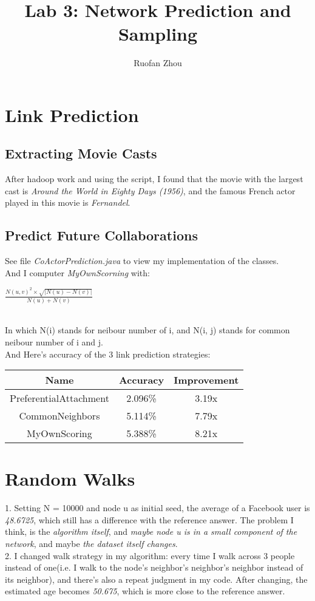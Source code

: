 \documentclass[11pt]{article} %
\title{Lab 3: Network Prediction and Sampling}
\author{Ruofan Zhou}
\begin{document}
\maketitle

\section{Link Prediction}
\subsection{Extracting Movie Casts}
After hadoop work and using the script, I found that the movie with the largest cast is \emph{Around the World in Eighty Days (1956)}, and the famous French actor played in this movie is \emph{Fernandel}.

\subsection{Predict Future Collaborations}
See file \emph{CoActorPrediction.java} to view my implementation of the classes.
\\
And I computer \emph{MyOwnScorning} with:
\\
\centerline{$\frac{N(u, v)^{2} \times \sqrt{|N(u)-N(v)|}}{N(u) + N(v)}$}
\\
In which N(i) stands for neibour number of i, and N(i, j) stands for common neibour number of i and j.
\\
And Here's accuracy of the 3 link prediction strategies: 

\begin{table}[!hbp]
\centering
\begin{tabular}{|c|c|c|}
\hline
Name & Accuracy & Improvement \\
\hline
PreferentialAttachment & 2.096\% & 3.19x \\
\hline
CommonNeighbors & 5.114\% & 7.79x \\
\hline
MyOwnScoring & 5.388\% & 8.21x \\
\hline
\end{tabular}
\end{table}

\section{Random Walks}
1. Setting N = 10000 and node u as initial seed, the average of a Facebook user is \emph{48.6725}, which still has a difference with the reference answer. The problem I think, is the \emph{algorithm itself}, and \emph{maybe node u is in a small component of the network}, and maybe \emph{the dataset itself changes}.
\\
2. I changed walk strategy in my algorithm: every time I walk across 3 people instead of one(i.e. I walk to the node's neighbor's neighbor's neighbor instead of its neighbor), and there's also a repeat judgment in my code. After changing, the estimated age becomes \emph{50.675}, which is more close to the reference answer.
\\
\end{document}
